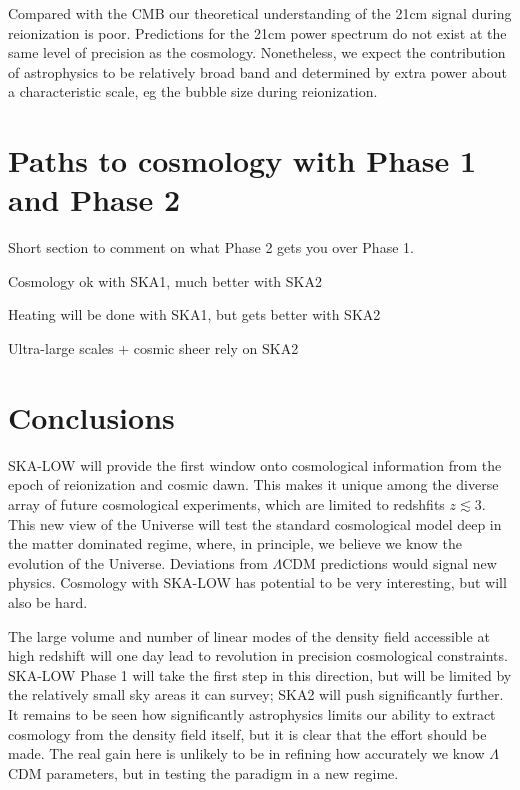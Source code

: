 \documentclass{PoS}
\begin{document}
Compared with the CMB our theoretical understanding of the 21cm signal during reionization is poor. Predictions for the 21cm power spectrum do not exist at the same level of precision as the cosmology. Nonetheless, we expect the contribution of astrophysics to be relatively broad band and determined by extra power about a characteristic scale, eg the bubble size during reionization.

\section{Paths to cosmology with Phase 1 and Phase 2}

Short section to comment on what Phase 2 gets you over Phase 1.

Cosmology ok with SKA1, much better with SKA2

Heating will be done with SKA1, but gets better with SKA2

Ultra-large scales + cosmic sheer rely on SKA2


\section{Conclusions}

SKA-LOW will provide the first window onto cosmological information from the epoch of reionization and cosmic dawn. This makes it unique among the diverse array of future cosmological experiments, which are limited to redshfits $z\lesssim3$. This new view of the Universe will test the standard cosmological model deep in the matter dominated regime, where, in principle, we believe we know the evolution of the Universe. Deviations from $\Lambda$CDM predictions would signal new physics. Cosmology with SKA-LOW has potential to be very interesting, but will also be hard.

The large volume and number of linear modes of the density field accessible at high redshift will one day lead to revolution in precision cosmological constraints. SKA-LOW Phase 1 will take the first step in this direction, but will be limited by the relatively small sky areas it can survey; SKA2 will push significantly further. It remains to be seen how significantly astrophysics limits our ability to extract cosmology from the density field itself, but it is clear that the effort should be made. The real gain here is unlikely to be in refining how accurately we know $\Lambda$CDM parameters, but in testing the paradigm in a new regime.
\end{document}
